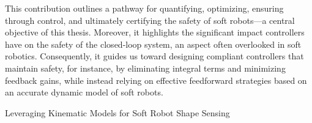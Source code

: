 This contribution outlines a pathway for quantifying, optimizing, ensuring through control, and ultimately certifying the safety of soft robots—a central objective of this thesis. Moreover, it highlights the significant impact controllers have on the safety of the closed-loop system, an aspect often overlooked in soft robotics. Consequently, it guides us toward designing compliant controllers that maintain safety, for instance, by eliminating integral terms and minimizing feedback gains, while instead relying on effective feedforward strategies based on an accurate dynamic model of soft robots.

\begin{contribution}\label{contrib:kinematic_models_shape_sensing}
    Leveraging Kinematic Models for Soft Robot Shape Sensing    
\end{contribution}

